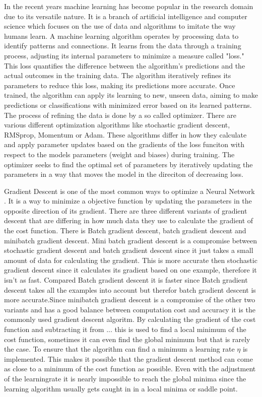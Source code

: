 \documentclass[
a4paper, 
12pt,
grayscalebody, %
abstract=on,
twoside, BCOR10mm, 12pt, DIV13,headinclude, footexclude, final, abstracton, openright
]{ibireprt}
\numberwithin{equation}{chapter}
\numberwithin{table}{chapter}
\numberwithin{figure}{chapter}
\numberwithin{algorithm}{chapter}
\numberwithin{example}{chapter}
\numberwithin{example}{chapter}
\begin{document}
In the recent years machine learning has become popular in the research domain due to its versatile nature. It is a branch of artificial intelligence and computer science which focuses on the use of data and algorithms to imitate the way humans learn. A machine learning algorithm operates by processing data to identify patterns and connections. It learns from the data through a training process, adjusting its internal parameters to minimize a measure called "loss." This loss quantifies the difference between the algorithm's predictions and the actual outcomes in the training data. The algorithm iteratively refines its parameters to reduce this loss, making its predictions more accurate. Once trained, the algorithm can apply its learning to new, unseen data, aiming to make predictions or classifications with minimized error based on its learned patterns.
The process of refining the data is done by a so called optimizer. There are various different optimization algorithms like stochastic gradient descent, RMSprop, Momentum or Adam. These algorithms differ in how they calculate and apply parameter updates based on the gradients of the loss funciton with respect to the models parameters (weight and biases) during training. The optimizer  seeks to find the optimal set of parameters by iteratively updating the parameters in a way that moves the model in the direciton of decreasing loss.

Gradient Descent is one of the most common ways to optimize a Neural Network \cite{Ruder2016}. It is a way to minimize a objective function by updating the parameters in the opposite direction of its gradient. There are three different variants of gradient descent that are differing in how much data they use to calculate the gradient of the cost function. There is Batch gradient descent, batch gradient descent and minibatch gradient descent. Mini batch gradient descent is a compromise between stochastic gradient descent and batch gradient descent since it just takes a small amount of data for calculating the gradient. This is more accurate then stochastic gradient descent since it calculates its gradient based on one example, therefore it isn't as fast. Compared Batch gradient descent it is faster since Batch gradient descent takes all the examples into account but therefor batch gradient descent is more accurate.Since minibatch gradient descent is a compromise of the other two variants and has a good balance between computation cost and accuracy it is the commonly used gradient descent algoritm. By calculating the gradient of the cost function and subtracting it from ... %
 this is used to find a local minimum of the cost function, sometimes it can even find the global minimum but that is rarely the case. To ensure that the algorithm can find a minimum a learning rate $\eta$ is implemented. This makes it possible that the gradient descent method can come as close to a minimum of the cost function as possible. Even with the adjustment of the learningrate it is nearly impossible to reach the global minima since the learning algorithm usually gets caught in in a local minima or saddle point.
 
\end{document}
